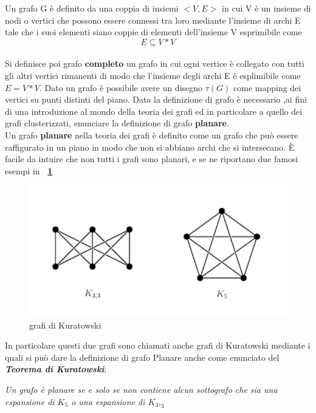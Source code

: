 Un grafo G è definito da una coppia di insiemi \textbf{$<V,E>$} in cui V è un insieme di nodi o vertici che possono essere connessi tra loro mediante l'insieme di archi E tale che i suoi elementi siano coppie di elementi dell'insieme V esprimibile come $$E \subseteq V * V$$ \\
Si definisce poi grafo \textbf{completo} un grafo in cui ogni vertice è collegato con tutti gli altri vertici rimanenti di modo che l'insieme degli archi E è esplimibile come $E= V * V$.
Dato un grafo è possibile avere un disegno $\tau(G)$ come mapping dei vertici su punti distinti del piano.
Data la definizione di grafo è necessario ,ai fini di una introduzione al mondo della teoria dei grafi ed in particolare a quello dei grafi clusterizzati, enunciare la definizione di grafo \textbf{planare}.\\
Un grafo\textbf{ planare }nella teoria dei grafi è definito come un grafo che può essere raffigurato in un piano in modo che non si abbiano archi che si intersecano. È facile da intuire che non tutti i grafi sono planari, e se ne riportano due famosi esempi in \textbf{\figurename~\ref{fig:kuratowski}}
\begin{figure}[!htb]
	\begin{center}
		\includegraphics[width=0.9 \linewidth]{figure/kuratowski}
	\end{center}
	\caption{grafi di Kuratowski \label{fig:kuratowski}}
\end{figure}
\newline
In particolare questi due grafi sono chiamati anche grafi di Kuratowski mediante i quali si può dare la definizione di grafo Planare anche come enunciato del \textit{\textbf{Teorema di Kuratowski}}:
\begin{center}
\textit{	Un grafo è planare \textit{se e solo se} non contiene alcun sottografo che sia una espansione di $K_5 $ o una espansione di $K_3,_3$\\}
\end{center}
